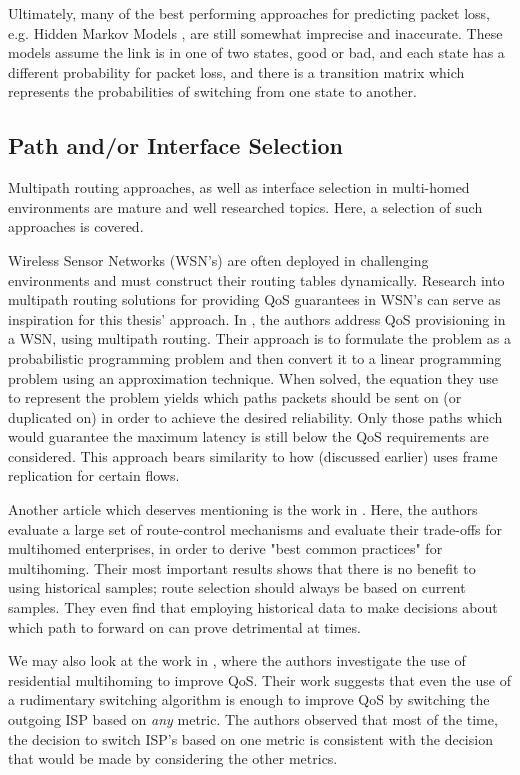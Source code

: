Ultimately, many of the best performing approaches for predicting packet loss, e.g. Hidden Markov Models \cite{tao2004exploring, bremler2002predicting}, are still somewhat imprecise and inaccurate. These models assume the link is in one of two states, good or bad, and each state has a different probability for packet loss, and there is a transition matrix which represents the probabilities of switching from one state to another.

\subsection{Path and/or Interface Selection}

Multipath routing approaches, as well as interface selection in multi-homed environments are mature and well researched topics. Here, a selection of such approaches is covered.

Wireless Sensor Networks (WSN's) are often deployed in challenging environments and must construct their routing tables dynamically. Research into multipath routing solutions for providing QoS guarantees in WSN's can serve as inspiration for this thesis' approach. In  \cite{huang2008multiconstrained}, the authors address QoS provisioning in a WSN, using multipath routing. Their approach is to formulate the problem as a probabilistic programming problem and then convert it to a linear programming problem using an approximation technique. When solved, the equation they use to represent the problem yields which paths packets should be sent on (or duplicated on) in order to achieve the desired reliability. Only those paths which would guarantee the maximum latency is still below the QoS requirements are considered. This approach bears similarity to how \cite{prados2021asynchronous} (discussed earlier) uses frame replication for certain flows.

Another article which deserves mentioning is the work in \cite{akella2008performance}. Here, the authors evaluate a large set of route-control mechanisms and evaluate their trade-offs for multihomed enterprises, in order to derive "best common practices" for multihoming. Their most important results shows that there is no benefit to using historical samples; route selection should always be based on current samples. They even find that employing historical data to make decisions about which path to forward on can prove detrimental at times.

We may also look at the work in \cite{habib2007improving}, where the authors investigate the use of residential multihoming to improve QoS. Their work suggests that even the use of a rudimentary switching algorithm is enough to improve QoS by switching the outgoing ISP based on \textit{any} metric. The authors observed that most of the time, the decision to switch ISP's based on one metric is consistent with the decision that would be made by considering the other metrics.

